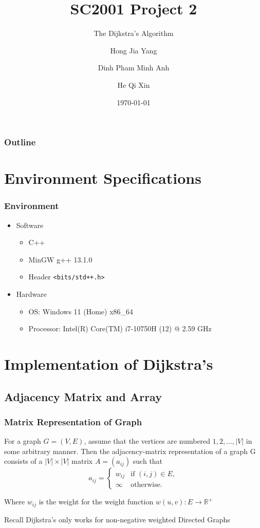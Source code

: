 \documentclass{beamer}
\title{SC2001 Project 2}
\subtitle{The Dijkstra's Algorithm}
\author[Hong, Dinh, He]{Hong Jia Yang \and Dinh Pham Minh Anh \and He Qi Xin}
\institute{Team 4}
\date{\today}
\begin{document}
\begin{frame}
	\titlepage
\end{frame}

\begin{frame}
	\frametitle{Outline}
	\tableofcontents
\end{frame}

\section{Environment Specifications}
\begin{frame}
	\frametitle{Environment}
	\begin{itemize}
		\item Software
		\begin{itemize}
			\item C++
			\item MinGW g++ 13.1.0	
			\item Header \texttt{<bits/std++.h>} 
		\end{itemize}
		\item Hardware
		\begin{itemize}
			\item OS: Windows 11 (Home) x86\_64
			\item Processor: Intel(R) Core(TM) i7-10750H (12) @ 2.59 GHz
		\end{itemize}	
	\end{itemize}
\end{frame}

\section{Implementation of Dijkstra's}
\subsection{Adjacency Matrix and Array}

\begin{frame}
	\frametitle{Matrix Representation of Graph}
	For a graph \( G = (V, E) \), assume that the vertices are numbered \( 1, 2, \hdots, \lvert{ V }\rvert  \) in some arbitrary manner. Then the adjacency-matrix representation of a graph G consists of a \( \lvert{ V }\rvert \times \lvert{ V }\rvert  \) matrix \( A = (a_{ij}) \) such that
	\[
		a_{ij} = \begin{cases}
			w_{ij} & \text{if } (i, j) \in E,\\
			\infty & \text{otherwise.} 
		\end{cases}
	\]

	Where \( w_{ij} \) is the weight for the weight function \( w(u, v) : E \rightarrow \mathbb{R}^+ \) 
	\onslide<2> \begin{block}{Recall}
		Dijkstra's only works for non-negative weighted Directed Graphs	
	\end{block}
\end{frame}
\end{document}
